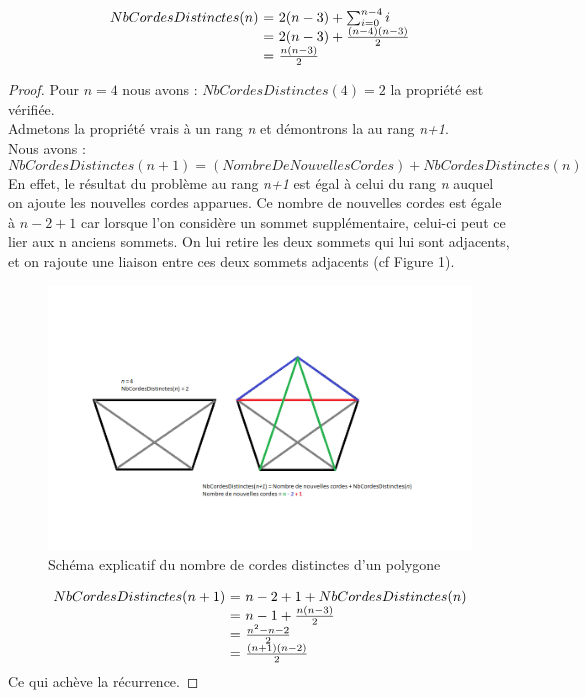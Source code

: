 \documentclass[a4paper,10pt]{article}
\begin{document}
\begin{equation} 
\begin{array}{r @{=} l}
NbCordesDistinctes(n) \ & \ 2(n-3) + \sum_{i=0}^{n-4} i \\
		      & \ 2(n-3) + \frac{(n-4)(n-3)}{2} \\
		      & \ \frac{n(n-3)}{2}
\end{array} 
\end{equation}


\begin{proof}
Pour \(n = 4\) nous avons : \(NbCordesDistinctes(4)=2 \) la propriété est vérifiée. \\
Admetons la propriété vrais à un rang \emph{n} et démontrons la au rang \emph{n+1}. \\
Nous avons :\\
\[NbCordesDistinctes(n+1) = (NombreDeNouvellesCordes) + NbCordesDistinctes(n)\]
En effet, le résultat du problème au rang \emph{n+1} est égal à celui du rang \emph{n} auquel on ajoute les nouvelles cordes apparues.
Ce nombre de nouvelles cordes est égale à \(n - 2 + 1 \) car lorsque l'on considère un sommet supplémentaire, celui-ci peut ce lier aux n anciens sommets.
On lui retire les deux sommets qui lui sont adjacents, et on rajoute une liaison entre ces deux sommets adjacents (cf Figure 1).

\begin{figure}[h!]
\begin{center}
\includegraphics[scale=0.5]{dem1.png}
\caption{Schéma explicatif du nombre de cordes distinctes d'un polygone}
\end{center}
\end{figure}

\[
\begin{array}{r @{=} l}
NbCordesDistinctes(n+1) \ & \ n -  2 + 1 + NbCordesDistinctes(n) \\
			  & \ n - 1 + \frac{n(n-3)}{2} \\
			  & \ \frac{{n^2}-n-2}{2} \\
			  & \ \frac{(n+1)(n-2)}{2} \\
\end{array}
\]
Ce qui achève la récurrence.	
\end{proof}
\end{document}
